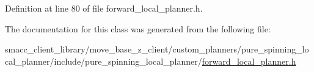 Definition at line 80 of file forward\+\_\+local\+\_\+planner.\+h.



The documentation for this class was generated from the following file\+:\begin{DoxyCompactItemize}
\item 
smacc\+\_\+client\+\_\+library/move\+\_\+base\+\_\+z\+\_\+client/custom\+\_\+planners/pure\+\_\+spinning\+\_\+local\+\_\+planner/include/pure\+\_\+spinning\+\_\+local\+\_\+planner/\hyperlink{pure__spinning__local__planner_2include_2pure__spinning__local__planner_2forward__local__planner_8h}{forward\+\_\+local\+\_\+planner.\+h}\end{DoxyCompactItemize}
